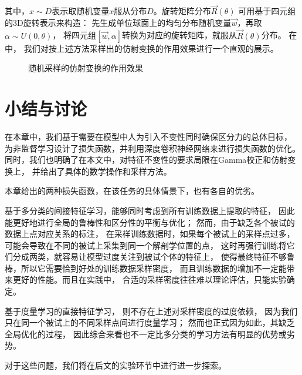 其中，$x\sim D$表示取随机变量$x$服从分布$D$。旋转矩阵分布$\vec{R}(\theta)$
可用基于四元组的3D旋转表示\cite{kuipers1999quaternions}来构造：
先生成单位球面上的均匀分布随机变量$\vec{w}$，再取$\alpha \sim U(0, \theta)$，
将四元组$[\vec{w}, \alpha]$转换为对应的旋转矩阵，就服从$\vec{R}(\theta)$分布。
在中，
我们对按上述方法采样出的仿射变换的作用效果进行一个直观的展示。

\begin{figure}[h!]
    \caption{随机采样的仿射变换的作用效果}
    \label{fig:cnn:aug:affine}
\end{figure}


\section{小结与讨论\label{sec:cnn:discuss}}
在本章中，我们基于需要在模型中人为引入不变性同时确保区分力的总体目标，
为非监督学习设计了损失函数，并利用深度卷积神经网络来进行损失函数的优化。
同时，我们也明确了在本文中，对特征不变性的要求局限在Gamma校正和仿射变换上，
并给出了具体的数学操作和采样方法。

本章给出的两种损失函数，在该任务的具体情景下，也有各自的优劣。

基于多分类的间接特征学习，能够同时考虑到所有训练数据上提取的特征，
因此能更好地进行全局的鲁棒性和区分性的平衡与优化；
然而，由于缺乏各个被试的数据上点对应关系的标注，
在采样训练数据时，如果每个被试上的采样点过多，
可能会导致在不同的被试上采集到同一个解剖学位置的点，
这时再强行训练将它们分成两类，就容易让模型过度关注到被试个体的特征上，
使得最终特征不够鲁棒，所以它需要恰到好处的训练数据采样密度，
而且训练数据的增加不一定能带来更好的性能。而且在实践中，
合适的采样密度往往难以理论评估，只能实验确定。

基于度量学习的直接特征学习，
则不存在上述对采样密度的过度依赖，
因为我们只在同一个被试上的不同采样点间进行度量学习；
然而也正式因为如此，其缺乏全局优化的过程，
因此综合来看也不一定比多分类的学习方法有明显的优势或劣势。

对于这些问题，我们将在后文的实验环节中进行进一步探索。


